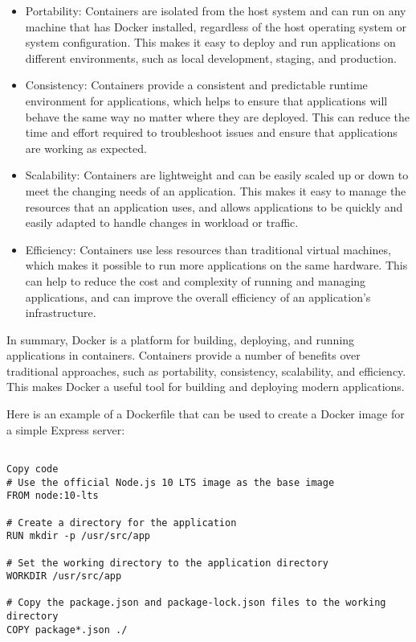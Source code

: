 {\begin{itemize}
\item Portability: Containers are isolated from the host system and can run on any machine that has Docker installed, regardless of the host operating system or system configuration. This makes it easy to deploy and run applications on different environments, such as local development, staging, and production.
\item Consistency: Containers provide a consistent and predictable runtime environment for applications, which helps to ensure that applications will behave the same way no matter where they are deployed. This can reduce the time and effort required to troubleshoot issues and ensure that applications are working as expected.
\item Scalability: Containers are lightweight and can be easily scaled up or down to meet the changing needs of an application. This makes it easy to manage the resources that an application uses, and allows applications to be quickly and easily adapted to handle changes in workload or traffic.
\item Efficiency: Containers use less resources than traditional virtual machines, which makes it possible to run more applications on the same hardware. This can help to reduce the cost and complexity of running and managing applications, and can improve the overall efficiency of an application's infrastructure.
\end{itemize}
In summary, Docker is a platform for building, deploying, and running applications in containers. Containers provide a number of benefits over traditional approaches, such as portability, consistency, scalability, and efficiency. This makes Docker a useful tool for building and deploying modern applications.


Here is an example of a Dockerfile that can be used to create a Docker image for a simple Express server:

\begin{lstlisting}[language=docker, caption=Dockerfile for node application]

Copy code
# Use the official Node.js 10 LTS image as the base image
FROM node:10-lts

# Create a directory for the application
RUN mkdir -p /usr/src/app

# Set the working directory to the application directory
WORKDIR /usr/src/app

# Copy the package.json and package-lock.json files to the working directory
COPY package*.json ./


\end{lstlisting}}
